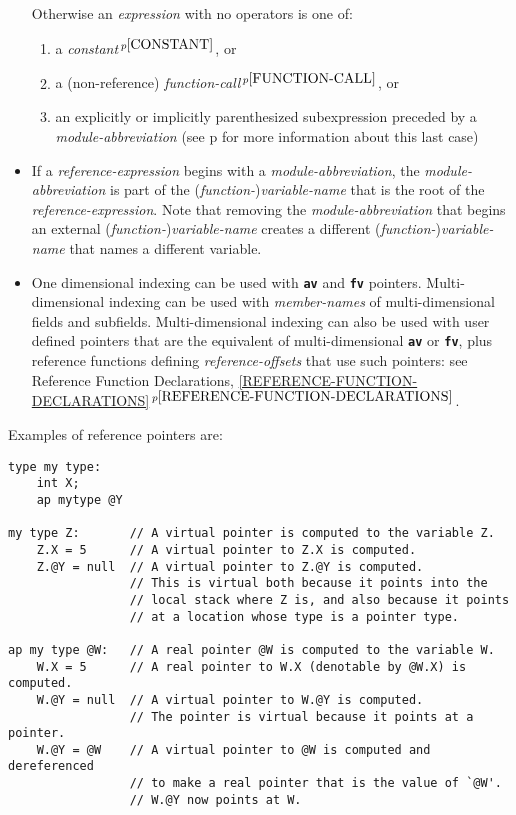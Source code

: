 \documentclass[12pt]{article}
\newcommand{\TT}[1]{{\tt \bfseries #1}}
\newcommand{\itemref}[1]{\ref{#1}$\,^{p\pageref{#1}}$}
\newcommand{\pagref}[1]{p\pageref{#1}}
\newcommand{\pagnote}[1]{$\,^{p\pageref{#1}}$}
\newenvironment{indpar}[1][0.3in]%
	{\begin{list}{}%
		     {\setlength{\itemsep}{0in}%
		      \setlength{\topsep}{0in}%
		      \setlength{\parsep}{1ex}%
		      \setlength{\labelwidth}{#1}%
		      \setlength{\leftmargin}{#1}%
		      \addtolength{\leftmargin}{\labelsep}}%
	 \item}%
	{\end{list}}
\begin{document}
\begin{indpar}
\begin{itemize}
Otherwise an {\em expression} with no operators is one of:
\begin{enumerate}
\item a {\em constant}\pagnote{CONSTANT}, or
\item
a (non-reference) {\em function-call}\pagnote{FUNCTION-CALL}, or
\item
an explicitly or implicitly parenthesized subexpression
preceded by a {\em module-abbreviation}
(see \pagref{MA-SYNTACTIC-SUGAR} for more information about this last case)
\end{enumerate}
\item If a {\em reference-expression} begins with a {\em module-abbreviation},
the {\em module-abbrevia\-tion}
is part of the ({\em function-}){\em variable-name} that is the
root of the {\em reference-expression}.
Note that removing the {\em module-abbreviation} that begins an external
({\em function-}){\em variable-name} creates a different
({\em function-}){\em variable-name} that names a different variable.
\item
One dimensional indexing can be used with \TT{av} and \TT{fv} pointers.
Multi-dimensional indexing can be used with {\em member-names}
of multi-dimensional fields and subfields.  Multi-dimensional indexing
can also be used
with user defined pointers that are the equivalent of multi-dimensional
\TT{av} or \TT{fv}, plus reference functions defining
{\em reference-offsets} that use such pointers:
see Reference Function Declarations,
\itemref{REFERENCE-FUNCTION-DECLARATIONS}.

\end{itemize}
\end{indpar}

Examples of reference pointers are:
\begin{indpar}\small\begin{verbatim}
type my type:
    int X;
    ap mytype @Y

my type Z:       // A virtual pointer is computed to the variable Z.
    Z.X = 5      // A virtual pointer to Z.X is computed.
    Z.@Y = null  // A virtual pointer to Z.@Y is computed.
                 // This is virtual both because it points into the
                 // local stack where Z is, and also because it points
                 // at a location whose type is a pointer type.

ap my type @W:   // A real pointer @W is computed to the variable W.
    W.X = 5      // A real pointer to W.X (denotable by @W.X) is computed.
    W.@Y = null  // A virtual pointer to W.@Y is computed.
                 // The pointer is virtual because it points at a pointer.
    W.@Y = @W    // A virtual pointer to @W is computed and dereferenced
                 // to make a real pointer that is the value of `@W'.
                 // W.@Y now points at W.
\end{verbatim}\end{indpar}
\end{document}
